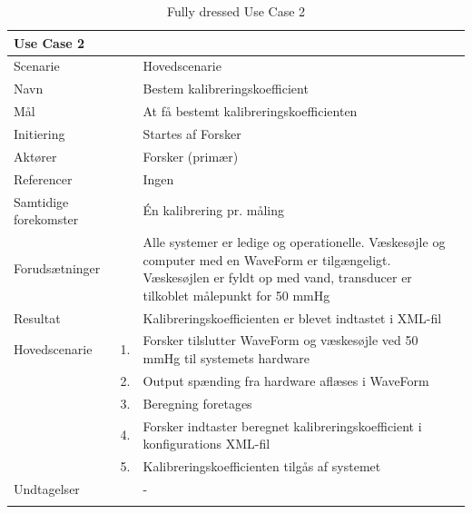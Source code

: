 \begin{longtabu} to  %
	{\large \textbf{Use Case 2}} && \\
	\toprule
	Scenarie 	&& Hovedscenarie\\
	Navn 		&& Bestem kalibreringskoefficient\\
	Mål 		&& At få bestemt kalibreringskoefficienten\\
	Initiering 	&& Startes af Forsker\\
	Aktører 	&& Forsker (primær)\\
	Referencer 	&& Ingen\\
	Samtidige forekomster  && Én kalibrering pr. måling\\
	Forudsætninger 	&& Alle systemer er ledige og operationelle. Væskesøjle og computer med en WaveForm er tilgængeligt. Væskesøjlen er fyldt op med vand, transducer er tilkoblet målepunkt for 50 mmHg\\ 
	Resultat 		&& Kalibreringskoefficienten er blevet indtastet i XML-fil\\ \midrule
	Hovedscenarie &    1. &		Forsker tilslutter WaveForm og væskesøjle ved 50 mmHg til systemets hardware\\[-1ex]
	&     2. & 	Output spænding fra hardware aflæses i WaveForm\\	 	
	&    3. & Beregning foretages\\[-1ex]
	&    4. & Forsker indtaster beregnet kalibreringskoefficient i konfigurations XML-fil\\[-1ex] 
	&    5. & Kalibreringskoefficienten tilgås af systemet\\ \midrule
	
	Undtagelser && - \\ 
	\bottomrule
	\caption{Fully dressed Use Case 2}
	\label{UC2}
\end{longtabu}

